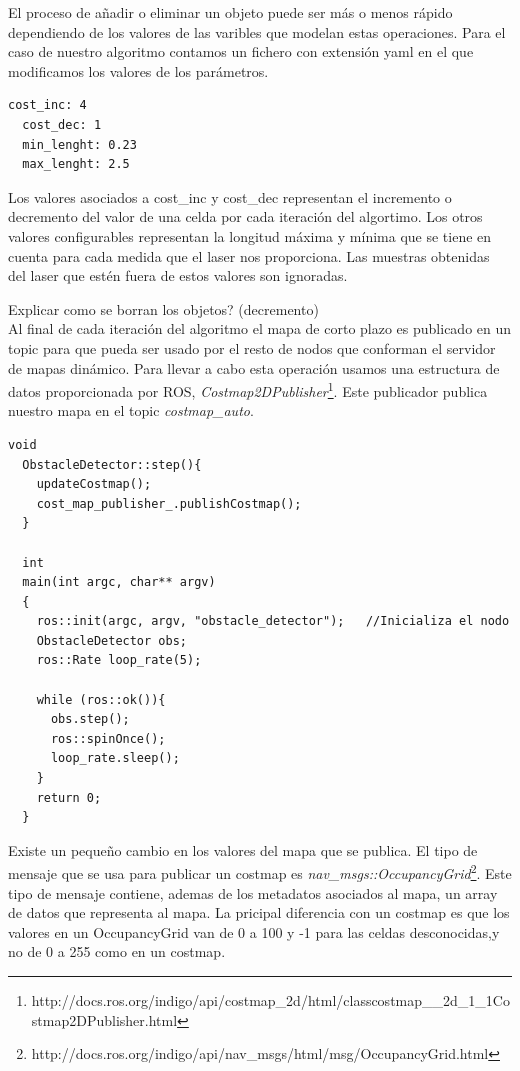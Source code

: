 El proceso de añadir o eliminar un objeto puede ser más o menos rápido dependiendo de los valores de las varibles que modelan estas operaciones. Para el caso de nuestro algoritmo contamos un fichero con extensión yaml en el que modificamos los valores de los parámetros.
\renewcommand{\lstlistingname}{Código}
\begin{lstlisting}[caption=Fichero de configuración obstacle\_detector.yaml, label={lst:obstacledetectorconfig}]
  cost_inc: 4
  cost_dec: 1
  min_lenght: 0.23
  max_lenght: 2.5
\end{lstlisting}
Los valores asociados a cost\_inc y cost\_dec representan el incremento o decremento del valor de una celda por cada iteración del algortimo. Los otros valores configurables representan la longitud máxima y mínima que se tiene en cuenta para cada medida que el laser nos proporciona. Las muestras obtenidas del laser que estén fuera de estos valores son ignoradas.

{Explicar como se borran los objetos? (decremento)}\\

Al final de cada iteración del algoritmo el mapa de corto plazo es publicado en un topic para que pueda ser usado por el resto de nodos que conforman el servidor de mapas dinámico. Para llevar a cabo esta operación usamos una estructura de datos proporcionada por ROS, \textit{Costmap2DPublisher}\footnote{http://docs.ros.org/indigo/api/costmap\_2d/html/classcostmap\_\_2d\_1\_1Costmap2DPublisher.html}. Este publicador publica nuestro mapa en el topic \textit{costmap\_auto}.\pagebreak
\renewcommand{\lstlistingname}{Código}
\begin{lstlisting}[caption=Step del nodo obstacle\_detector, label={lst:stepobstacledetector}]
  void
  ObstacleDetector::step(){
    updateCostmap();
    cost_map_publisher_.publishCostmap();
  }

  int
  main(int argc, char** argv)
  {
    ros::init(argc, argv, "obstacle_detector");   //Inicializa el nodo
    ObstacleDetector obs;
    ros::Rate loop_rate(5);

    while (ros::ok()){
      obs.step();
      ros::spinOnce();
      loop_rate.sleep();
    }
    return 0;
  }

\end{lstlisting}

Existe un pequeño cambio en los valores del mapa que se publica. El tipo de mensaje que se usa para publicar un costmap es \textit{nav\_msgs::OccupancyGrid}\footnote{http://docs.ros.org/indigo/api/nav\_msgs/html/msg/OccupancyGrid.html}. Este tipo de mensaje contiene, ademas de los metadatos asociados al mapa, un array de datos que representa al mapa. La pricipal diferencia con un costmap es que los valores en un OccupancyGrid van de 0 a 100 y -1 para las celdas desconocidas,y no de 0 a 255 como en un costmap.

